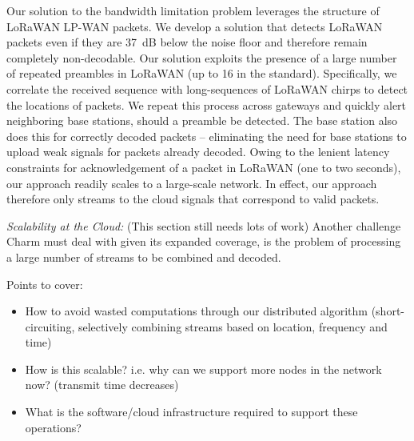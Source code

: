 Our solution to the bandwidth limitation problem leverages the structure of
LoRaWAN LP-WAN packets. We develop a solution that detects LoRaWAN packets
even if they are 37~dB below the noise floor and therefore remain completely
non-decodable. Our solution exploits the presence of a large number of
repeated preambles in LoRaWAN (up to 16 in the standard). Specifically, we
correlate the received sequence with long-sequences of LoRaWAN chirps to
detect the locations of packets. We repeat this process across gateways and
quickly alert neighboring base stations, should a preamble be detected. The
base station also does this for correctly decoded packets -- eliminating the
need for base stations to upload weak signals for packets already decoded.
Owing to the lenient latency constraints for acknowledgement of a packet in
LoRaWAN (one to two seconds), our approach readily scales to a large-scale
network. In effect, our approach therefore only streams to the cloud signals
that correspond to valid packets.

\textit{Scalability at the Cloud:} {\color{blue} (This section still needs
lots of work)} Another challenge Charm must deal with given its expanded
coverage, is the problem of processing a large number of streams to be
combined and decoded.

{\color{blue} Points to cover:
\begin{itemize}
    \item How to avoid wasted computations through our distributed algorithm
    (short-circuiting, selectively combining streams based on location,
    frequency and time)
    \item How is this scalable? i.e. why can we support more nodes in the
    network now? (transmit time decreases)
    \item What is the software/cloud infrastructure required to support these
    operations?
\end{itemize}
}


